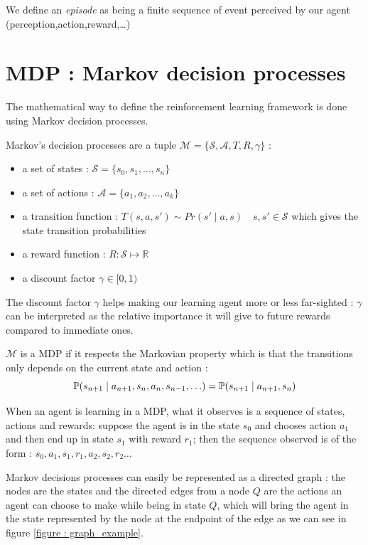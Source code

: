 \documentclass[14pt,a4paper]{article}
\theoremstyle{definition}
\begin{document}
We define an \emph{episode} as being a finite sequence of event perceived by our agent (perception,action,reward,\ldots)

\section{MDP : Markov decision processes}



The mathematical way to define the reinforcement learning framework is done using Markov decision processes.

Markov's decision processes are a tuple  $\mathcal{M}=\{\mathcal{S},\mathcal{A},T,R,\gamma\}$ : 

\begin{itemize}
\item a set of states : $\mathcal{S}=\{s_0,s_1,\ldots,s_n\}$
\item a set of actions  : $\mathcal{A}=\{a_1,a_2,\ldots ,a_k\}$
\item a transition function :  $T(s,a,s') \sim  Pr(s'\mid a, s) \quad s,s' \in \mathcal{S}$ which gives the state transition probabilities
\item a reward function : $R:\mathcal{S}\mapsto \mathbb{R} $
\item a discount factor $\gamma \in [0,1)$
\end{itemize}


The discount factor $\gamma $ helps making our learning agent more or less far-sighted : $\gamma$ can be interpreted as the relative importance it will give to future rewards compared to immediate ones.

$\mathcal{M}$ is a MDP if it respects the Markovian property which is that the transitions only depends on the current state and action : 
\begin{equation*}
\mathbb{P}(s_{n+1}\mid a_{n+1},s_{n},a_{n},s_{n-1},\ldots)=\mathbb{P}(s_{n+1}\mid a_{n+1},s_{n})\\
\end{equation*}


When an agent is learning in a MDP, what it observes is a sequence of states, actions and rewards: suppose the agent is in the state $s_0$ and chooses action $a_1$ and then end up in state $s_1$ with reward $r_1$; then the sequence observed is of the form : $s_0,a_1,s_1,r_1,a_2,s_2,r_2\ldots$


Markov decisions processes can easily be  represented as a directed graph : the nodes are the states and the directed edges from a node $Q$ are the actions an agent can choose to make while being in state $Q$, which will bring the agent in the state represented by the node at the endpoint of the edge as we can see in figure \ref{figure : graph_example}.
\end{document}
